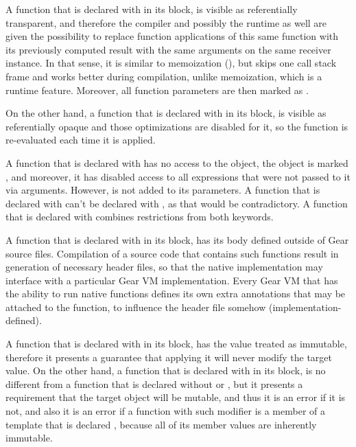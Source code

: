 A function that is declared with  in its  block, is visible as referentially transparent, and therefore the compiler and possibly the runtime as well are given the possibility to replace function applications of this same function with its previously computed result with the same arguments on the same receiver instance. In that sense, it is similar to memoization (), but skips one call stack frame and works better during compilation, unlike memoization, which is a runtime feature. Moreover, all function parameters are then marked as . 

On the other hand, a function that is declared with  in its  block, is visible as referentially opaque and those optimizations are disabled for it, so the function is re-evaluated each time it is applied. 

A function that is declared with  has no access to the  object, the  object is marked , and moreover, it has disabled access to all expressions that were not passed to it via arguments. However,  is not added to its parameters. A function that is declared with  can't be declared with , as that would be contradictory. A function that is declared with  combines restrictions from both keywords. 

A function that is declared with  in its  block, has its body defined outside of Gear source files. Compilation of a source code that contains such functions result in generation of necessary header files, so that the native implementation may interface with a particular Gear VM implementation. Every Gear VM that has the ability to run native functions defines its own extra annotations that may be attached to the function, to influence the header file somehow (implementation-defined). 

A function that is declared with  in its  block, has the  value treated as immutable, therefore it presents a guarantee that applying it will never modify the target value. On the other hand, a function that is declared with  in its  block, is no different from a function that is declared without  or , but it presents a requirement that the target object will be mutable, and thus it is an error if it is not, and also it is an error if a function with such modifier is a member of a template that is declared , because all of its member values are inherently immutable. 

